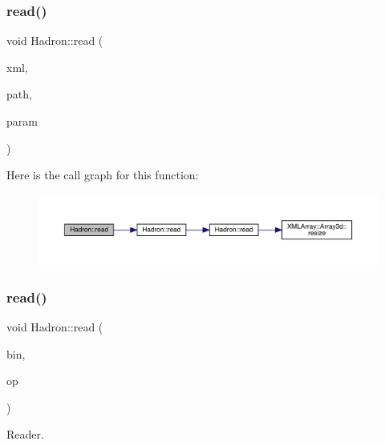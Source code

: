 \subsubsection{\texorpdfstring{read()}{read()}\hspace{0.1cm}{\footnotesize\ttfamily [86/94]}}
{\footnotesize\ttfamily void Hadron\+::read (\begin{DoxyParamCaption}\item[{\mbox{\hyperlink{classADATXML_1_1XMLReader}{X\+M\+L\+Reader}} \&}]{xml,  }\item[{const std\+::string \&}]{path,  }\item[{\mbox{\hyperlink{structHadron_1_1SingleHadronQuarkDeriv__t}{Single\+Hadron\+Quark\+Deriv\+\_\+t}} \&}]{param }\end{DoxyParamCaption})}

Here is the call graph for this function\+:\nopagebreak
\begin{figure}[H]
\begin{center}
\leavevmode
\includegraphics[width=350pt]{d1/daf/namespaceHadron_a0b9e3ade4af9d7765000d9cd6477956e_cgraph}
\end{center}
\end{figure}
\mbox{\label{namespaceHadron_ad5dee2ca1e22f01bd860ef607035e36f}} 
\subsubsection{\texorpdfstring{read()}{read()}\hspace{0.1cm}{\footnotesize\ttfamily [87/94]}}
{\footnotesize\ttfamily void Hadron\+::read (\begin{DoxyParamCaption}\item[{\mbox{\hyperlink{classADATIO_1_1BinaryReader}{Binary\+Reader}} \&}]{bin,  }\item[{\mbox{\hyperlink{structHadron_1_1SingleHadronQuarkDeriv__t}{Single\+Hadron\+Quark\+Deriv\+\_\+t}} \&}]{op }\end{DoxyParamCaption})}



Reader. 

